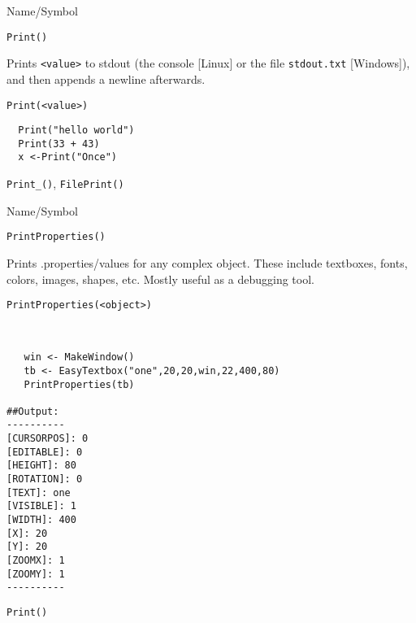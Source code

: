 \rl


\begin{desc}{Name/Symbol}
\item[Name/Symbol]	\verb+Print()+

\item[Description]	Prints \verb+<value>+ to stdout (the console [Linux] or the file \texttt{stdout.txt} [Windows]), and then appends a newline afterwards.

\item[Usage]		
\begin{verbatim}
Print(<value>)
\end{verbatim}

\item[Example]	
\begin{verbatim}
  Print("hello world")
  Print(33 + 43)
  x <-Print("Once")

\end{verbatim}
\item[See Also]	\verb+Print_()+, \verb+FilePrint()+
\end{desc}

\rl

\begin{desc}{Name/Symbol}
\item[Name/Symbol]	\verb+PrintProperties()+

\item[Description]	Prints .properties/values for any complex object.
  These include textboxes, fonts, colors, images, shapes, etc. Mostly
  useful as a debugging tool.

\item[Usage]		
\begin{verbatim}
PrintProperties(<object>)
\end{verbatim}

\item[Example]	
\begin{verbatim}


   win <- MakeWindow()
   tb <- EasyTextbox("one",20,20,win,22,400,80)
   PrintProperties(tb)

##Output:
----------
[CURSORPOS]: 0
[EDITABLE]: 0
[HEIGHT]: 80
[ROTATION]: 0
[TEXT]: one
[VISIBLE]: 1
[WIDTH]: 400
[X]: 20
[Y]: 20
[ZOOMX]: 1
[ZOOMY]: 1
----------

\end{verbatim}
\item[See Also]	\verb+Print()+
\end{desc}

\rl




